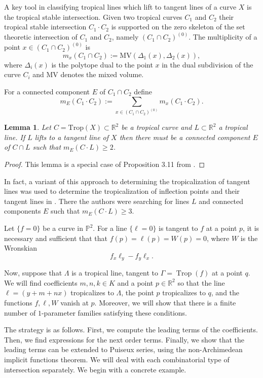 \documentclass[oneside]{amsart}
\newcommand{\RR}{\mathbb{R}}
\DeclareMathOperator{\trop}{Trop}
\newtheorem{lemma}[thm]{Lemma}
\theoremstyle{definition}
\begin{document}
A key tool in classifying tropical lines which lift to tangent lines of a curve $X$ is the tropical stable intersection. Given two tropical curves $C_1$ and $C_2$ their tropical stable intersection $C_1 \cdot C_2$  is supported on the zero skeleton of the set theoretic intersection of $C_1$ and $C_2$, namely $(C_1 \cap C_2)^{(0)}$. The multiplicity of a point  $x \in (C_1 \cap C_2)^{(0)}$
is 
$$m_x( C_1 \cap C_2) := \text{MV}( \Delta_1(x), \Delta_2(x)),$$
where $\Delta_i(x)$ is the polytope dual to the point $x$ in the dual subdivision of the curve $C_i$ and $\text{MV}$ denotes the mixed volume. 

For a connected component $E$ of $C_1 \cap C_2$ define
$$m_E(C_1 \cdot C_2) := \sum_{x \in (C_1 \cap C_2)^{(0)}} m_x( C_1 \cdot C_2). $$
\begin{lemma}\label{lemma:stableint}
Let $C   = \text{Trop}(X) \subset \RR^2$ be a tropical curve and $L \subset \RR^2$ a tropical line. If $L$ lifts to a tangent line of $X$ then there must be a connected component $E$ of $C \cap L$ such that $m_E( C \cdot L) \geq 2$. 
\end{lemma}

\begin{proof}
This lemma is a special case of Proposition 3.11 from \cite{BrugalleLopez}. 
\end{proof}


In fact, a variant of this approach to determining the tropicalization of tangent lines  was used to determine the tropicalization of inflection points and their tangent lines in \cite{BrugalleLopez}. There the authors were searching for lines $L$ and connected components $E$ such that  $m_E(C \cdot L) \geq 3$. 


Let $\{f=0\}$ be a curve in $\mathbb{P}^2$. For a line $\{\ell=0\}$ is tangent to $f$ at a point $p$, it is necessary and sufficient that  that $f(p)=\ell(p)=W(p) = 0$, where $W$ is the Wronskian 
\[
f_x\ell_y - f_y\ell_x.
\] 

Now, suppose that $\Lambda$ is a tropical line, tangent to $\Gamma=\trop(f)$ at a point $q$. We will find coefficients $m,n,k\in K$ and a point $p\in\mathbb{R}^2$ so that the line $\ell= (y+m+nx)$ tropicalizes to $\Lambda$, the point  $p$ tropicalizes to $q$, and the functions $f,\ell,W$ vanish at $p$. Moreover, we will show that there is a finite number of $1$-parameter families satisfying these conditions. 

The strategy is as follows. First, we compute the leading terms of the coefficients. Then, we find expressions for the next order terms. Finally, we show that the leading terms can be extended to Puiseux series, using the non-Archimedean implicit functions theorem. We will deal with each combinatorial type of  intersection separately. We begin with a concrete example. 
\end{document}
